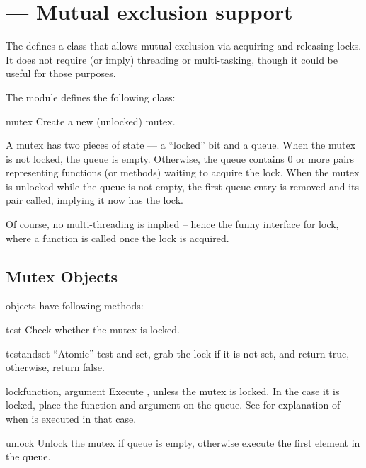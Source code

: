 \section{ ---
         Mutual exclusion support}


The  defines a class that allows mutual-exclusion
via acquiring and releasing locks. It does not require (or imply)
threading or multi-tasking, though it could be useful for
those purposes.

The  module defines the following class:

\begin{classdesc}{mutex}{}
Create a new (unlocked) mutex.

A mutex has two pieces of state --- a ``locked'' bit and a queue.
When the mutex is not locked, the queue is empty.
Otherwise, the queue contains 0 or more 
 pairs
representing functions (or methods) waiting to acquire the lock.
When the mutex is unlocked while the queue is not empty,
the first queue entry is removed and its 
 pair called,
implying it now has the lock.

Of course, no multi-threading is implied -- hence the funny interface
for lock, where a function is called once the lock is acquired.
\end{classdesc}


\subsection{Mutex Objects \label{mutex-objects}}

 objects have following methods:

\begin{methoddesc}{test}{}
Check whether the mutex is locked.
\end{methoddesc}

\begin{methoddesc}{testandset}{}
``Atomic'' test-and-set, grab the lock if it is not set,
and return true, otherwise, return false.
\end{methoddesc}

\begin{methoddesc}{lock}{function, argument}
Execute , unless the mutex is locked.
In the case it is locked, place the function and argument on the queue.
See  for explanation of when
 is executed in that case.
\end{methoddesc}

\begin{methoddesc}{unlock}{}
Unlock the mutex if queue is empty, otherwise execute the first element
in the queue.
\end{methoddesc}
